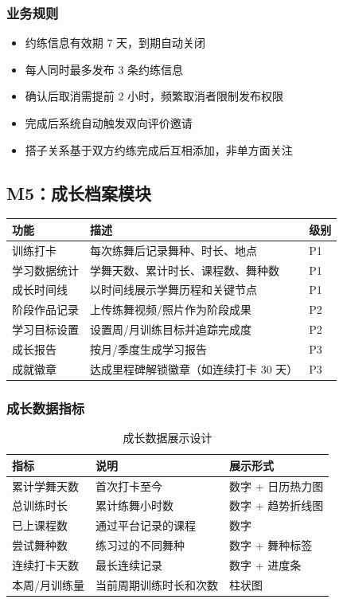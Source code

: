 \documentclass[12pt,a4paper]{ctexart}
\begin{document}
\subsubsection{业务规则}

\begin{itemize}
    \item 约练信息有效期 7 天，到期自动关闭
    \item 每人同时最多发布 3 条约练信息
    \item 确认后取消需提前 2 小时，频繁取消者限制发布权限
    \item 完成后系统自动触发双向评价邀请
    \item 搭子关系基于双方约练完成后互相添加，非单方面关注
\end{itemize}

\subsection{M5：成长档案模块}

\begin{table}[H]
\centering
\begin{tabularx}{\textwidth}{L{3cm}X C{0.8cm}}
\toprule
\textbf{功能} & \textbf{描述} & \textbf{级别} \\
\midrule
训练打卡 & 每次练舞后记录舞种、时长、地点 & P1 \\
学习数据统计 & 学舞天数、累计时长、课程数、舞种数 & P1 \\
成长时间线 & 以时间线展示学舞历程和关键节点 & P1 \\
阶段作品记录 & 上传练舞视频/照片作为阶段成果 & P2 \\
学习目标设置 & 设置周/月训练目标并追踪完成度 & P2 \\
成长报告 & 按月/季度生成学习报告 & P3 \\
成就徽章 & 达成里程碑解锁徽章（如连续打卡 30 天） & P3 \\
\bottomrule
\end{tabularx}
\end{table}

\subsubsection{成长数据指标}

\begin{table}[H]
\centering
\caption{成长数据展示设计}
\begin{tabularx}{\textwidth}{L{3.5cm}L{4cm}X}
\toprule
\textbf{指标} & \textbf{说明} & \textbf{展示形式} \\
\midrule
累计学舞天数 & 首次打卡至今 & 数字 + 日历热力图 \\
总训练时长 & 累计练舞小时数 & 数字 + 趋势折线图 \\
已上课程数 & 通过平台记录的课程 & 数字 \\
尝试舞种数 & 练习过的不同舞种 & 数字 + 舞种标签 \\
连续打卡天数 & 最长连续记录 & 数字 + 进度条 \\
本周/月训练量 & 当前周期训练时长和次数 & 柱状图 \\
\bottomrule
\end{tabularx}
\end{table}
\end{document}
